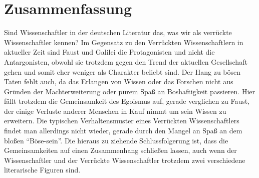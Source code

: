 \documentclass[12pt]{scrreprt}
\begin{document}
\chapter{Zusammenfassung}
	\label{chap:zusammenfassung}
Sind Wissenschaftler in der deutschen Literatur das, was wir als verrückte Wissenschaftler kennen?
Im Gegensatz zu den Verrückten Wissenschaftlern in aktueller Zeit sind Faust und Galilei die Protagonisten und nicht die Antargonisten, obwohl sie trotzdem gegen den Trend der aktuellen Gesellschaft gehen und somit eher weniger als Charakter beliebt sind.
Der Hang zu bösen Taten fehlt auch, da das Erlangen von Wissen oder das Forschen nicht aus Gründen der Machterweiterung oder purem Spaß an Boshaftigkeit passieren.
Hier fällt trotzdem die Gemeinsamkeit des Egoismus auf, gerade verglichen zu Faust, der einige Verluste anderer Menschen in Kauf nimmt um sein Wissen zu erweitern.
Die typischen Verhaltensmuster eines Verrückten Wissenschaftlers findet man allerdings nicht wieder, gerade durch den Mangel an Spaß an dem bloßen \enquote{Böse-sein}.
Die hieraus zu ziehende Schlussfolgerung ist, dass die Gemeinsamkeiten auf einen Zusammenhang schließen lassen, auch wenn der Wissenschaftler und der Verrückte Wissenschaftler trotzdem zwei verschiedene literarische Figuren sind.

\printbibliography
\end{document}

